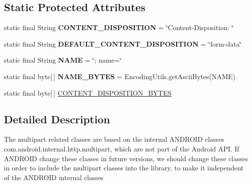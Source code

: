 \subsection*{Static Protected Attributes}
\begin{DoxyCompactItemize}
\item 
\hypertarget{classcom_1_1bluevia_1_1commons_1_1connector_1_1http_1_1multipart_1_1BlueviaPartBase_a15075b92ac156d3355f10e35e58e6c39}{
static final String {\bfseries CONTENT\_\-DISPOSITION} = \char`\"{}Content-\/Disposition: \char`\"{}}
\label{classcom_1_1bluevia_1_1commons_1_1connector_1_1http_1_1multipart_1_1BlueviaPartBase_a15075b92ac156d3355f10e35e58e6c39}

\item 
\hypertarget{classcom_1_1bluevia_1_1commons_1_1connector_1_1http_1_1multipart_1_1BlueviaPartBase_ab21a71ee54de47908265cd8910c77335}{
static final String {\bfseries DEFAULT\_\-CONTENT\_\-DISPOSITION} = \char`\"{}form-\/data\char`\"{}}
\label{classcom_1_1bluevia_1_1commons_1_1connector_1_1http_1_1multipart_1_1BlueviaPartBase_ab21a71ee54de47908265cd8910c77335}

\item 
\hypertarget{classcom_1_1bluevia_1_1commons_1_1connector_1_1http_1_1multipart_1_1BlueviaPartBase_af3ebb19035c00bfb287535de9161d534}{
static final String {\bfseries NAME} = \char`\"{}; name=\char`\"{}}
\label{classcom_1_1bluevia_1_1commons_1_1connector_1_1http_1_1multipart_1_1BlueviaPartBase_af3ebb19035c00bfb287535de9161d534}

\item 
\hypertarget{classcom_1_1bluevia_1_1commons_1_1connector_1_1http_1_1multipart_1_1BlueviaPartBase_a6a34d34f1b9a101e5f0debb13d319381}{
static final byte\mbox{[}$\,$\mbox{]} {\bfseries NAME\_\-BYTES} = EncodingUtils.getAsciiBytes(NAME)}
\label{classcom_1_1bluevia_1_1commons_1_1connector_1_1http_1_1multipart_1_1BlueviaPartBase_a6a34d34f1b9a101e5f0debb13d319381}

\item 
static final byte\mbox{[}$\,$\mbox{]} \hyperlink{classcom_1_1bluevia_1_1commons_1_1connector_1_1http_1_1multipart_1_1BlueviaPartBase_aaebbdce2d484b6e3e9361fd2fedea75d}{CONTENT\_\-DISPOSITION\_\-BYTES}
\end{DoxyCompactItemize}


\subsection{Detailed Description}
The multipart related classes are based on the internal ANDROID classes com.android.internal.http.multipart, which are not part of the Android API. If ANDROID change these classes in future versions, we should change these classes in order to include the multipart classes into the library, to make it independent of the ANDROID internal classes

